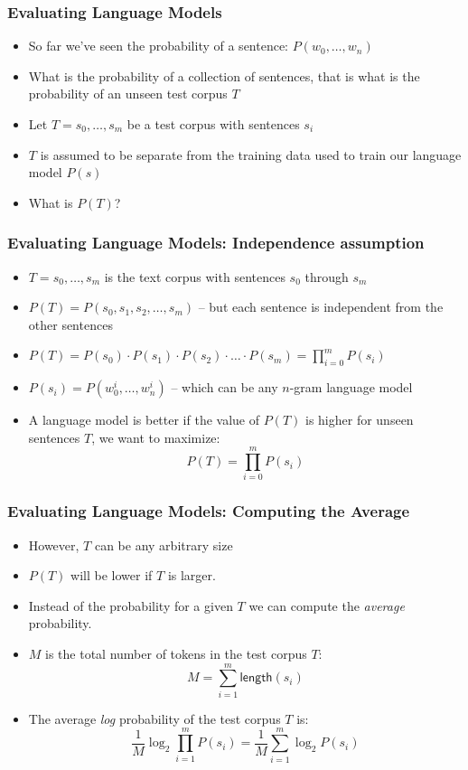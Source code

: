 \begin{frame}
\frametitle{Evaluating Language Models}
\begin{itemize}[<+->]
\item So far we've seen the probability of a sentence: $P(w_0, \ldots, w_n)$
\item What is the probability of a collection of sentences, that is what is the probability of an unseen test corpus $T$
\item Let $T = s_0, \ldots, s_m$ be a test corpus with sentences $s_i$
\item $T$ is assumed to be separate from the training data used to train our language model $P(s)$
\item What is $P(T)$?
\end{itemize}
\end{frame}

\begin{frame}
\frametitle{Evaluating Language Models: Independence assumption}
\begin{itemize}[<+->]
\item $T = s_0, \ldots, s_m$ is the text corpus with sentences $s_0$ through $s_m$
\item $P(T) = P(s_0, s_1, s_2, \ldots, s_m)$ -- but each sentence is independent from the other sentences
\item $P(T) = P(s_0) \cdot P(s_1) \cdot P(s_2) \cdot \ldots \cdot P(s_m) = \prod_{i=0}^m P(s_i)$ 
\item $P(s_i) = P(w_0^i, \ldots, w_n^i)$ -- which can be any $n$-gram language model
\item A language model is better if the value of $P(T)$ is higher for unseen sentences $T$, we want to maximize:
\[ P(T) = \prod_{i=0}^m P(s_i) \]
\end{itemize}
\end{frame}

\begin{frame}
\frametitle{Evaluating Language Models: Computing the Average}
\begin{itemize}[<+->]
\item However, $T$ can be any arbitrary size
\item $P(T)$ will be lower if $T$ is larger.
\item Instead of the probability for a given $T$ we can compute the {\em average} probability.
\item $M$ is the total number of tokens in the test corpus $T$:
\[ M = \sum_{i=1}^m \textsf{length}(s_i) \]
\item The average {\em log} probability of the test corpus $T$ is:
\[ \frac{1}{M} \log_2 \prod_{i=1}^m P(s_i) = \frac{1}{M} \sum_{i=1}^m \log_2 P(s_i) \]
\end{itemize}
\end{frame}


